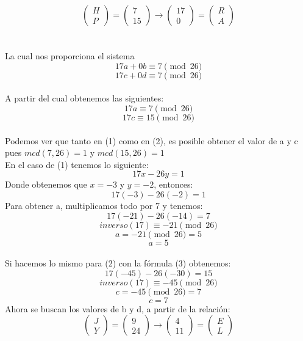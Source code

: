 \documentclass[12pt, letterpaper]{article}
\begin{document}
$$
\begin{pmatrix}
H \\ P 
\end{pmatrix}
=
\begin{pmatrix}
7 \\ 15
\end{pmatrix}
\longrightarrow
\begin{pmatrix}
17 \\ 0 
\end{pmatrix}
=
\begin{pmatrix}
R \\ A
\end{pmatrix}
$$\\
\\
La cual nos proporciona el sistema 
\\
$$17a + 0b \equiv 7 \pmod{26}$$
$$17c + 0d \equiv 7 \pmod{26}$$
\\
A partir del cual obtenemos las siguientes:
\\
\begin{equation}
17a \equiv 7 \pmod{26}
\end{equation}
\begin{equation}
17c \equiv 15 \pmod{26}
\end{equation}
\\
Podemos ver que tanto en (1) como en (2), es posible obtener el valor de a y c pues $mcd(7,26)=1$ y $mcd(15,26)=1$
\\
En el caso de (1) tenemos lo siguiente:
\begin{equation}
17x - 26y = 1
\end{equation}
Donde obtenemos que $x=-3$ y $y=-2$, entonces:
$$17(-3)-26(-2)=1$$
Para obtener a, multiplicamos todo por 7 y tenemos:
$$17(-21)-26(-14)=7$$
$$inverso(17) \equiv -21 \pmod{26}$$
$$a = -21 \pmod{26} = 5$$
$$a = 5$$
\\
Si hacemos lo mismo para (2) con la fórmula (3) obtenemos:
$$17(-45)-26(-30)=15$$
$$inverso(17) \equiv -45 \pmod{26}$$
$$c = -45 \pmod{26} = 7$$
$$c = 7$$
Ahora se buscan los valores de b y d, a partir de la relación:
$$
\begin{pmatrix}
J \\ Y 
\end{pmatrix}
=
\begin{pmatrix}
9 \\ 24
\end{pmatrix}
\longrightarrow
\begin{pmatrix}
4 \\ 11 
\end{pmatrix}
=
\begin{pmatrix}
E \\ L
\end{pmatrix}
$$\\
\end{document}

